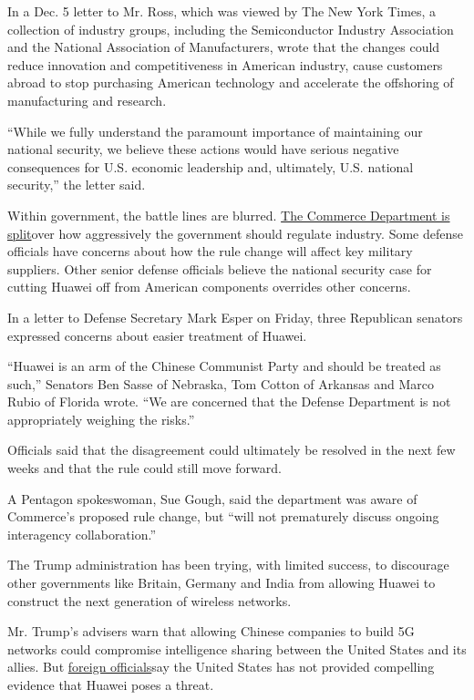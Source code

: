 In a Dec. 5 letter to Mr. Ross, which was viewed by The New York Times,
a collection of industry groups, including the Semiconductor Industry
Association and the National Association of Manufacturers, wrote that
the changes could reduce innovation and competitiveness in American
industry, cause customers abroad to stop purchasing American technology
and accelerate the offshoring of manufacturing and research.

``While we fully understand the paramount importance of maintaining our
national security, we believe these actions would have serious negative
consequences for U.S. economic leadership and, ultimately, U.S. national
security,'' the letter said.

Within government, the battle lines are blurred.
\href{https://www.nytimes.com/2019/10/23/business/trump-technology-china-trade.html}{The
Commerce Department is split}over how aggressively the government should
regulate industry. Some defense officials have concerns about how the
rule change will affect key military suppliers. Other senior defense
officials believe the national security case for cutting Huawei off from
American components overrides other concerns.

In a letter to Defense Secretary Mark Esper on Friday, three Republican
senators expressed concerns about easier treatment of Huawei.

``Huawei is an arm of the Chinese Communist Party and should be treated
as such,'' Senators Ben Sasse of Nebraska, Tom Cotton of Arkansas and
Marco Rubio of Florida wrote. ``We are concerned that the Defense
Department is not appropriately weighing the risks.''

Officials said that the disagreement could ultimately be resolved in the
next few weeks and that the rule could still move forward.

A Pentagon spokeswoman, Sue Gough, said the department was aware of
Commerce's proposed rule change, but ``will not prematurely discuss
ongoing interagency collaboration.''

The Trump administration has been trying, with limited success, to
discourage other governments like Britain, Germany and India from
allowing Huawei to construct the next generation of wireless networks.

Mr. Trump's advisers warn that allowing Chinese companies to build 5G
networks could compromise intelligence sharing between the United States
and its allies. But
\href{https://www.nytimes.com/aponline/2020/01/14/business/bc-eu-britain-huawei.html}{foreign
officials}say the United States has not provided compelling evidence
that Huawei poses a threat.

